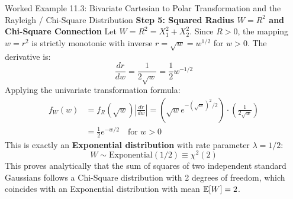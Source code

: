 \begin{examplebox}[breakable]{Worked Example 11.3: Bivariate Cartesian to Polar Transformation and the Rayleigh / Chi-Square Distribution}
\textbf{Step 5: Squared Radius $W = R^2$ and Chi-Square Connection}
Let $W = R^2 = X_1^2 + X_2^2$. Since $R > 0$, the mapping $w = r^2$ is strictly monotonic with inverse $r = \sqrt{w} = w^{1/2}$ for $w > 0$.
The derivative is:
\begin{equation}
\frac{dr}{dw} = \frac{1}{2\sqrt{w}} = \frac{1}{2} w^{-1/2}
\end{equation}
Applying the univariate transformation formula:
\begin{align}
f_W(w) &= f_R(\sqrt{w}) \left| \frac{dr}{dw} \right| = \left( \sqrt{w} e^{-(\sqrt{w})^2/2} \right) \cdot \left( \frac{1}{2\sqrt{w}} \right) \nonumber \\
&= \frac{1}{2} e^{-w/2} \quad \text{for } w > 0
\end{align}
This is exactly an \textbf{Exponential distribution} with rate parameter $\lambda = 1/2$:
\begin{equation}
W \sim \text{Exponential}(1/2) \equiv \chi^2(2)
\end{equation}
This proves analytically that the sum of squares of two independent standard Gaussians follows a Chi-Square distribution with 2 degrees of freedom, which coincides with an Exponential distribution with mean $\operatorname{\mathbb{E}}[W] = 2$.
\end{examplebox}

